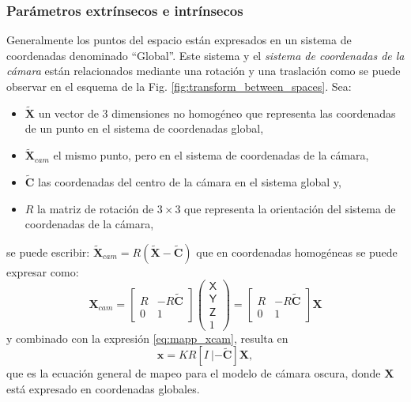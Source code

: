 \subsubsection{Parámetros extrínsecos e intrínsecos}
Generalmente los puntos del espacio están expresados en un sistema de coordenadas denominado ``Global''. Este sistema y el \textit{sistema de coordenadas de la cámara} están relacionados mediante una rotación y una traslación como se puede observar en el esquema de la Fig. \ref{fig:transform_between_spaces}. Sea:
\begin{itemize}
 \item $\tilde{\mathbf{X}}$ un vector de 3 dimensiones no homogéneo que representa las coordenadas de un punto en el sistema de coordenadas global,
 \item $\tilde{\mathbf{X}}_{cam}$ el mismo punto, pero en el sistema de coordenadas de la cámara,
 \item $\tilde{\mathbf{C}}$ las coordenadas del centro de la cámara en el sistema global y,
 \item $R$ la matriz de rotación de $3 \times 3$ que representa la orientación del sistema de coordenadas de la cámara,
\end{itemize}
se puede escribir: $\tilde{\mathbf{X}}_{cam}=R(\tilde{\mathbf{X}}-\tilde{\mathbf{C}})$ que en coordenadas homogéneas se puede expresar como:
\begin{equation}
\label{eq:xcam_homogenea}
\mathbf{X}_{cam} = 
\left[\begin{array}{cc}
R & -R \tilde{\mathbf{C}}\\
0 & 1
\end{array}\right]
\left(\begin{array}{c}
\mathsf{X}\\
\mathsf{Y}\\
\mathsf{Z}\\
1
\end{array}\right)
=
\left[\begin{array}{cc}
R & -R \tilde{\mathbf{C}}\\
0 & 1
\end{array}\right]
\mathbf{X}
\end{equation}
y combinado con la expresión \ref{eq:mapp_xcam}, resulta en 
\begin{equation}
\label{eq:xcam_homog_combinado}
\mathbf{x}=KR[I\:|\mathbf{-\tilde{\mathbf{C}}}]\mathbf{X},
\end{equation}
que es la ecuación general de mapeo para el modelo de cámara oscura, donde $\mathbf{X}$ está expresado en coordenadas globales.
